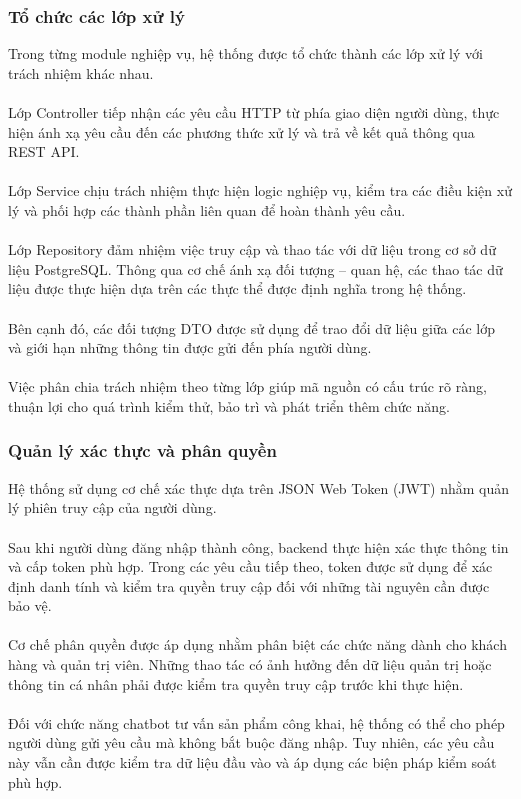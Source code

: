 \documentclass{report}
\begin{document}
\subsubsection{Tổ chức các lớp xử lý}
Trong từng module nghiệp vụ, hệ thống được tổ chức
thành các lớp xử lý với trách nhiệm khác nhau.\\\\
Lớp Controller tiếp nhận các yêu cầu HTTP từ phía
giao diện người dùng, thực hiện ánh xạ yêu cầu đến
các phương thức xử lý và trả về kết quả thông qua
REST API.\\\\
Lớp Service chịu trách nhiệm thực hiện logic nghiệp
vụ, kiểm tra các điều kiện xử lý và phối hợp các
thành phần liên quan để hoàn thành yêu cầu.\\\\
Lớp Repository đảm nhiệm việc truy cập và thao tác
với dữ liệu trong cơ sở dữ liệu PostgreSQL. Thông
qua cơ chế ánh xạ đối tượng -- quan hệ, các thao
tác dữ liệu được thực hiện dựa trên các thực thể
được định nghĩa trong hệ thống.\\\\
Bên cạnh đó, các đối tượng DTO được sử dụng để
trao đổi dữ liệu giữa các lớp và giới hạn những
thông tin được gửi đến phía người dùng.\\\\
Việc phân chia trách nhiệm theo từng lớp giúp mã
nguồn có cấu trúc rõ ràng, thuận lợi cho quá trình
kiểm thử, bảo trì và phát triển thêm chức năng.

\subsubsection{Quản lý xác thực và phân quyền}
Hệ thống sử dụng cơ chế xác thực dựa trên JSON Web
Token (JWT) nhằm quản lý phiên truy cập của người
dùng.\\\\
Sau khi người dùng đăng nhập thành công, backend
thực hiện xác thực thông tin và cấp token phù hợp.
Trong các yêu cầu tiếp theo, token được sử dụng
để xác định danh tính và kiểm tra quyền truy cập
đối với những tài nguyên cần được bảo vệ.\\\\
Cơ chế phân quyền được áp dụng nhằm phân biệt các
chức năng dành cho khách hàng và quản trị viên.
Những thao tác có ảnh hưởng đến dữ liệu quản trị
hoặc thông tin cá nhân phải được kiểm tra quyền
truy cập trước khi thực hiện.\\\\
Đối với chức năng chatbot tư vấn sản phẩm công
khai, hệ thống có thể cho phép người dùng gửi yêu
cầu mà không bắt buộc đăng nhập. Tuy nhiên, các
yêu cầu này vẫn cần được kiểm tra dữ liệu đầu vào
và áp dụng các biện pháp kiểm soát phù hợp.
\end{document}

